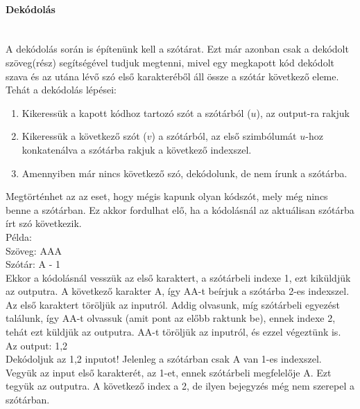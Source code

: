 \documentclass[margin=0px]{article}
\begin{document}
    \paragraph*{Dekódolás\\\\}

    A dekódolás során is építenünk kell a szótárat. Ezt már azonban csak a dekódolt szöveg(rész) segítségével tudjuk megtenni, mivel egy megkapott kód dekódolt szava és az utána lévő szó első karakteréből áll össze a szótár következő eleme.\\
					
	\noindent Tehát a dekódolás lépései:
	\begin{enumerate}
		\item Kikeressük a kapott kódhoz tartozó szót a szótárból ($u$), az output-ra rakjuk
		\item Kikeressük a következő szót ($v$) a szótárból, az első szimbólumát $u$-hoz konkatenálva a szótárba rakjuk a következő indexszel.
		\item Amennyiben már nincs következő szó, dekódolunk, de nem írunk a szótárba.
	\end{enumerate}
					
    \noindent Megtörténhet az az eset, hogy mégis kapunk olyan kódszót, mely még nincs benne a szótárban. Ez akkor fordulhat elő, ha a kódolásnál az aktuálisan szótárba írt szó következik.\\
\newpage						
	\noindent Példa:\\
					
	\noindent Szöveg: AAA\\
	\noindent Szótár: A - 1\\
					
    \noindent Ekkor a kódolásnál vesszük az első karaktert, a szótárbeli indexe 1, ezt kiküldjük az outputra. A következő karakter A, így AA-t beírjuk a szótárba 2-es indexszel. Az első karaktert töröljük az inputról. Addig olvasunk, míg szótárbeli egyezést találunk, így AA-t olvassuk (amit pont az előbb raktunk be), ennek indexe 2, tehát ezt küldjük az outputra. AA-t töröljük az inputról, és ezzel végeztünk is. Az output: 1,2\\
					
    \noindent Dekódoljuk az 1,2 inputot! Jelenleg a szótárban csak A van 1-es indexszel. Vegyük az input első karakterét, az 1-et, ennek szótárbeli megfelelője A. Ezt tegyük az outputra. A következő index a 2, de ilyen bejegyzés még nem szerepel a szótárban. \\
					
\end{document}
